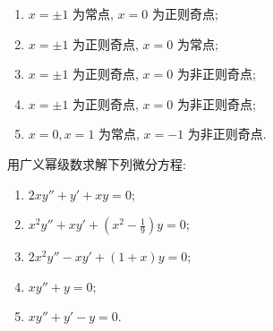 \begin{solve}
  \begin{enumerate}[(1)]
    \item $x=\pm 1$ 为常点, $x=0$ 为正则奇点;
    \item $x=\pm 1$ 为正则奇点, $x=0$ 为常点;
    \item $x=\pm 1$ 为正则奇点, $x=0$ 为非正则奇点;
    \item $x=\pm 1$ 为正则奇点, $x=0$ 为非正则奇点;
    \item $x=0,x=1$ 为常点, $x=-1$ 为非正则奇点.\qedhere
  \end{enumerate}
\end{solve}



\begin{exercise}
  用广义幂级数求解下列微分方程:
  \begin{enumerate}[(1)]
  \item $2xy''+y'+xy=0$;
  \item $x^2y''+xy'+\left(x^2-\frac{1}{9}\right)y=0$;
  \item $2x^2y''-xy'+(1+x)y=0$;
  \item $xy''+y=0$;
  \item $xy''+y'-y=0$.
  \end{enumerate}
\end{exercise}

